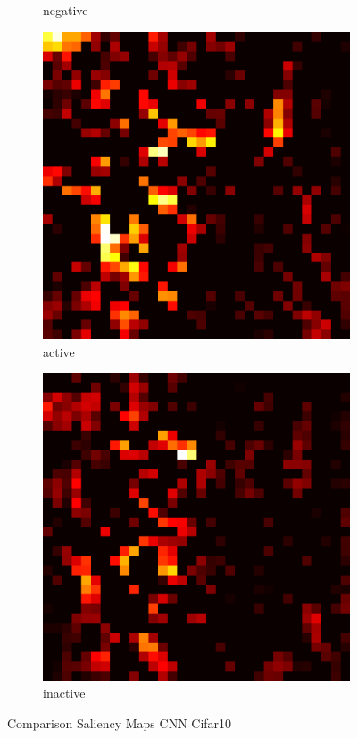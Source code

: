 \documentclass[preprint,12pt]{elsarticle}
\begin{document}
\begin{figure}
\begin{subfigure}{0.14\textwidth}
        \caption{negative}
    \end{subfigure}
    \hfill
    \begin{subfigure}{0.14\textwidth}
        \centering
        \includegraphics[width=\linewidth]{../visualizations/examples/cifar10/cnn/active_saliency_map/2.png}
        \caption{active}
    \end{subfigure}
    \hfill
    \begin{subfigure}{0.14\textwidth}
        \centering
        \includegraphics[width=\linewidth]{../visualizations/examples/cifar10/cnn/inactive_saliency_map/2.png}
        \caption{inactive}
    \end{subfigure}
    \caption{Comparison Saliency Maps CNN Cifar10}
    \label{fig: comparison saliency maps cnn cifar10}
\end{figure}
\end{document}
